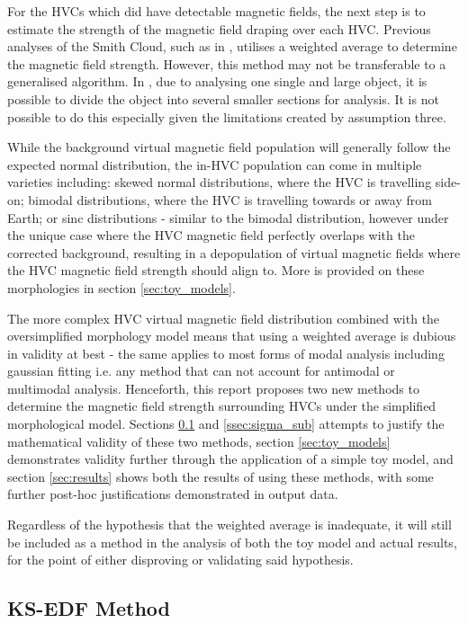 For the HVCs which did have detectable magnetic fields, the next step is to estimate the strength of the magnetic field draping over each HVC. Previous analyses of the Smith Cloud, such as in \cite{ID5, ID26}, utilises a weighted average to determine the magnetic field strength. However, this method may not be transferable to a generalised algorithm. In \cite{ID5, ID26}, due to analysing one single and large object, it is possible to divide the object into several smaller sections for analysis. It is not possible to do this especially given the limitations created by assumption three.


While the background virtual magnetic field population will generally follow the expected normal distribution, the in-HVC population can come in multiple varieties including: skewed normal distributions, where the HVC is travelling side-on; bimodal distributions, where the HVC is travelling towards or away from Earth; or sinc distributions - similar to the bimodal distribution, however under the unique case where the HVC magnetic field perfectly overlaps with the corrected background, resulting in a depopulation of virtual magnetic fields where the HVC magnetic field strength should align to. More is provided on these morphologies in section \ref{sec:toy_models}.


The more complex HVC virtual magnetic field distribution combined with the oversimplified morphology model means that using a weighted average is dubious in validity at best - the same applies to most forms of modal analysis including gaussian fitting i.e. any method that can not account for antimodal or multimodal analysis. Henceforth, this report proposes two new methods to determine the magnetic field strength surrounding HVCs under the simplified morphological model. Sections \ref{ssec:KS_EDF} and \ref{ssec:sigma_sub} attempts to justify the mathematical validity of these two methods, section \ref{sec:toy_models} demonstrates validity further through the application of a simple toy model, and section \ref{sec:results} shows both the results of using these methods, with some further post-hoc justifications demonstrated in output data.


Regardless of the hypothesis that the weighted average is inadequate, it will still be included as a method in the analysis of both the toy model and actual results, for the point of either disproving or validating said hypothesis.


\subsection{KS-EDF Method}
\label{ssec:KS_EDF}


